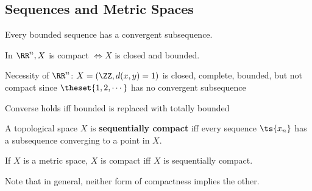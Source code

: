 \hypertarget{sequences-and-metric-spaces}{%
\subsection{Sequences and Metric
Spaces}\label{sequences-and-metric-spaces}}

\begin{theorem}

Every bounded sequence has a convergent subsequence.

\end{theorem}

\begin{theorem}

In \(\RR^n, X\) is compact \(\iff X\) is closed and bounded.

\end{theorem}

\begin{remark}

Necessity of \(\RR^n\): \(X = (\ZZ, d(x,y) = 1)\) is closed, complete,
bounded, but not compact since \(\theset{1,2,\cdots}\) has no convergent
subsequence

\end{remark}

\begin{proposition}

Converse holds iff bounded is replaced with totally bounded

\end{proposition}

\begin{definition}

A topological space \(X\) is \textbf{sequentially compact} iff every
sequence \(\ts{x_n}\) has a subsequence converging to a point in \(X\).

\end{definition}

\begin{proposition}

If \(X\) is a metric space, \(X\) is compact iff \(X\) is sequentially
compact.

\end{proposition}

\begin{remark}

Note that in general, neither form of compactness implies the other.

\end{remark}

